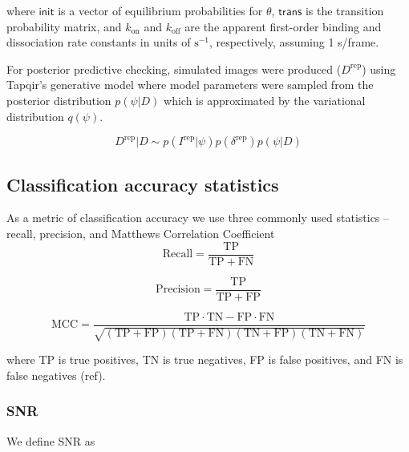 \noindent
where $\mathsf{init}$ is a vector of equilibrium probabilities for $\theta$, $\mathsf{trans}$ is the transition probability matrix, and $k_{\mathrm{on}}$ and $k_{\mathrm{off}}$ are the apparent first-order binding and dissociation rate constants in units of $\mathrm{s}^{-1}$, respectively, assuming 1 s/frame.

For posterior predictive checking, simulated images were produced ($D^\mathrm{rep}$) using Tapqir's generative model where model parameters were sampled from the posterior distribution $p(\psi|D)$ which is approximated by the variational distribution $q(\psi)$. %

\begin{equation}
    D^\mathrm{rep} | D \sim p(I^\mathrm{rep} | \psi) p(\delta^\mathrm{rep}) p(\psi | D)
\end{equation}

\subsection*{Classification accuracy statistics}

As a metric of classification accuracy we use three commonly used statistics -- recall, precision, and Matthews Correlation Coefficient \cite{Matthews1975-rw}
\begin{equation}
    \mathrm{Recall} = \dfrac{\mathrm{TP}}{\mathrm{TP} + \mathrm{FN}}
\end{equation}

\begin{equation}
    \mathrm{Precision} = \dfrac{\mathrm{TP}}{\mathrm{TP} + \mathrm{FP}}
\end{equation}

\begin{equation}
    \mathrm{MCC} =
        \dfrac{\mathrm{TP} \cdot \mathrm{TN} - \mathrm{FP} \cdot \mathrm{FN}}
        {\sqrt{(\mathrm{TP} + \mathrm{FP}) (\mathrm{TP} + \mathrm{FN}) (\mathrm{TN} + \mathrm{FP}) (\mathrm{TN} + \mathrm{FN})}}
\end{equation}

\noindent
where TP is true positives, TN is true negatives, FP is false positives, and FN is false negatives (ref).

\subsubsection*{SNR}

We define SNR as

